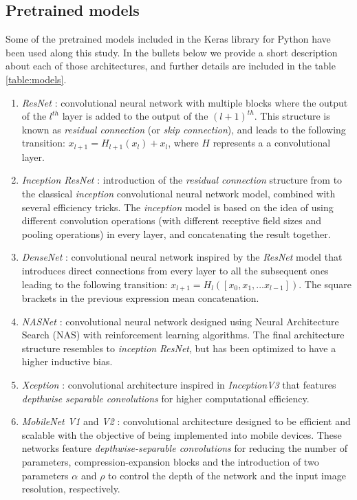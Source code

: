 \documentclass{elsarticle}
\begin{document}
    \subsection{Pretrained models}
    Some of the pretrained models included in the Keras library for Python \cite{chollet2015keras} have been used along this study. In the bullets below we provide a short description about each of those architectures, and further details are included in the table \ref{table:models}.
    
    \begin{enumerate}
    	\item \textit{ResNet} \cite{he2016}: convolutional neural network with multiple blocks where the output of the $l^{th}$ layer is added to the output of the $(l+1)^{th}$. This structure is known as \textit{residual connection} (or \textit{skip connection}), and leads to the following transition: $x_{l+1} = H_{l+1}(x_{l}) + x_l$, where $H$ represents a a convolutional layer.
    	\item \textit{Inception ResNet} \cite{szegedy2017}: introduction of the \textit{residual connection} structure from \cite{he2016} to the classical \textit{inception} convolutional neural network model, combined with several efficiency tricks. The \textit{inception} model is based on the idea of using different convolution operations (with different receptive field sizes and pooling operations) in every layer, and concatenating the result together. 
    	\item \textit{DenseNet} \cite{huang2017}: convolutional neural network inspired by the \textit{ResNet} model \cite{he2016} that introduces direct connections from every layer to all the subsequent ones leading to the following transition: $x_{l+1} = H_l([x_0, x_1, ... x_{l-1}])$. The square brackets in the previous expression mean concatenation. 
    	\item \textit{NASNet} \cite{pham2018}: convolutional neural network designed using Neural Architecture Search (NAS) with reinforcement learning algorithms. The final architecture structure resembles to \textit{inception} \textit{ResNet}, but has been optimized to have a higher inductive bias.
    	\item \textit{Xception} \cite{chollet2017}: convolutional architecture inspired in \textit{InceptionV3}  \cite{szegedy2016} that features \textit{depthwise separable convolutions} for higher computational efficiency.
    	\item \textit{MobileNet V1} and \textit{V2} \cite{howard2017, sandler2018}: convolutional architecture designed to be efficient and scalable with the objective of being implemented into mobile devices. These networks feature \textit{depthwise-separable convolutions} for reducing the number of parameters, compression-expansion blocks and the introduction of two parameters $\alpha$ and $\rho$ to control the depth of the network and the input image resolution, respectively.

\end{enumerate}
\end{document}
